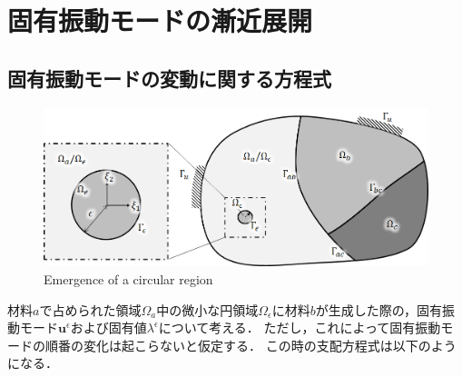 \chapter{固有振動モードの漸近展開}
\section{固有振動モードの変動に関する方程式}
\begin{figure}[ht]
	\begin{center}
		\includegraphics[width=13cm]{./figures/TD.png}
		\caption{Emergence of a circular region}
		\label{fig:TD}
	\end{center}
\end{figure}
材料$a$で占められた領域$\Omega_a$中の微小な円領域$\Omega_\epsilon$に材料$b$が生成した際の，固有振動モード$\bm{u}^{\epsilon}$および固有値$\lambda^{\epsilon}$について考える．
ただし，これによって固有振動モードの順番の変化は起こらないと仮定する．
この時の支配方程式は以下のようになる．

